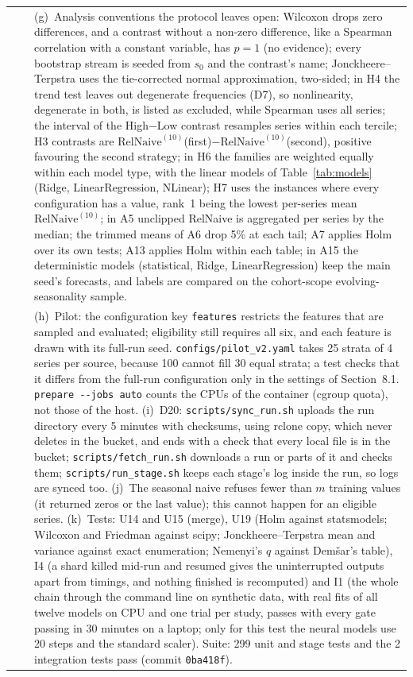 \documentclass[11pt,a4paper]{article}
\newcommand{\code}[1]{\texttt{#1}}
\newcommand{\RN}{\mathrm{RelNaive}^{(10)}}
\begin{document}
\begin{longtable}{@{}p{1.3cm} p{1.9cm} p{11.8cm}@{}}
 & & (g)~Analysis conventions the protocol leaves open: Wilcoxon drops zero differences, and a contrast without a non-zero difference, like a Spearman correlation with a constant variable, has $p = 1$ (no evidence); every bootstrap stream is seeded from $s_0$ and the contrast's name; Jonckheere--Terpstra uses the tie-corrected normal approximation, two-sided; in H4 the trend test leaves out degenerate frequencies (D7), so nonlinearity, degenerate in both, is listed as excluded, while Spearman uses all series; the interval of the High$-$Low contrast resamples series within each tercile; H3 contrasts are $\RN$(first)$-\RN$(second), positive favouring the second strategy; in H6 the families are weighted equally within each model type, with the linear models of Table~\ref{tab:models} (Ridge, LinearRegression, NLinear); H7 uses the instances where every configuration has a value, rank~1 being the lowest per-series mean $\RN$; in A5 unclipped RelNaive is aggregated per series by the median; the trimmed means of A6 drop 5\% at each tail; A7 applies Holm over its own tests; A13 applies Holm within each table; in A15 the deterministic models (statistical, Ridge, LinearRegression) keep the main seed's forecasts, and labels are compared on the cohort-scope evolving-seasonality sample. \\
 & & (h)~Pilot: the configuration key \code{features} restricts the features that are sampled and evaluated; eligibility still requires all six, and each feature is drawn with its full-run seed. \mbox{\code{configs/pilot_v2.yaml}} takes 25 strata of 4 series per source, because 100 cannot fill 30 equal strata; a test checks that it differs from the full-run configuration only in the settings of Section~8.1. \code{prepare -{}-jobs auto} counts the CPUs of the container (cgroup quota), not those of the host. (i)~D20: \mbox{\code{scripts/sync_run.sh}} uploads the run directory every 5 minutes with checksums, using rclone copy, which never deletes in the bucket, and ends with a check that every local file is in the bucket; \mbox{\code{scripts/fetch_run.sh}} downloads a run or parts of it and checks them; \mbox{\code{scripts/run_stage.sh}} keeps each stage's log inside the run, so logs are synced too. (j)~The seasonal naive refuses fewer than $m$ training values (it returned zeros or the last value); this cannot happen for an eligible series. (k)~Tests: U14 and U15 (merge), U19 (Holm against statsmodels; Wilcoxon and Friedman against scipy; Jonckheere--Terpstra mean and variance against exact enumeration; Nemenyi's $q$ against Dem\v{s}ar's table), I4 (a shard killed mid-run and resumed gives the uninterrupted outputs apart from timings, and nothing finished is recomputed) and I1 (the whole chain through the command line on synthetic data, with real fits of all twelve models on CPU and one trial per study, passes with every gate passing in 30 minutes on a laptop; only for this test the neural models use 20 steps and the standard scaler). Suite: 299 unit and stage tests and the 2 integration tests pass (commit \code{0ba418f}). \\

\end{longtable}
\end{document}
